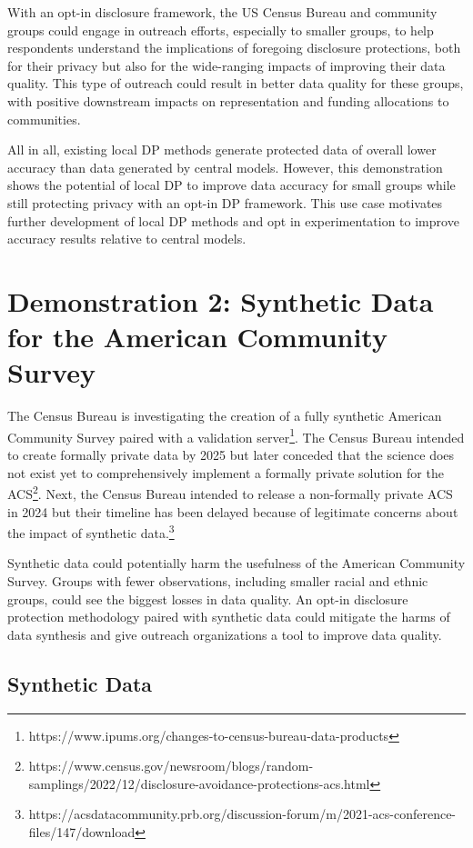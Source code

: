 \documentclass[
]{urban-formatting}
\begin{document}
With an opt-in disclosure framework, the US Census Bureau and community
groups could engage in outreach efforts, especially to smaller groups,
to help respondents understand the implications of foregoing disclosure
protections, both for their privacy but also for the wide-ranging
impacts of improving their data quality. This type of outreach could
result in better data quality for these groups, with positive downstream
impacts on representation and funding allocations to communities.

All in all, existing local DP methods generate protected data of overall
lower accuracy than data generated by central models. However, this
demonstration shows the potential of local DP to improve data accuracy
for small groups while still protecting privacy with an opt-in DP
framework. This use case motivates further development of local DP
methods and opt in experimentation to improve accuracy results relative
to central models.

\section{Demonstration 2: Synthetic Data for the American Community Survey}

The Census Bureau is investigating the creation of a fully synthetic
American Community Survey paired with a validation server\footnote{https://www.ipums.org/changes-to-census-bureau-data-products}.
The Census Bureau intended to create formally private data by 2025 but
later conceded that the science does not exist yet to comprehensively
implement a formally private solution for the ACS\footnote{https://www.census.gov/newsroom/blogs/random-samplings/2022/12/disclosure-avoidance-protections-acs.html}.
Next, the Census Bureau intended to release a non-formally private ACS
in 2024 but their timeline has been delayed because of legitimate
concerns about the impact of synthetic data.\footnote{https://acsdatacommunity.prb.org/discussion-forum/m/2021-acs-conference-files/147/download}

Synthetic data could potentially harm the usefulness of the American
Community Survey. Groups with fewer observations, including smaller
racial and ethnic groups, could see the biggest losses in data quality.
An opt-in disclosure protection methodology paired with synthetic data
could mitigate the harms of data synthesis and give outreach
organizations a tool to improve data quality.

\subsection{Synthetic Data}
\end{document}
